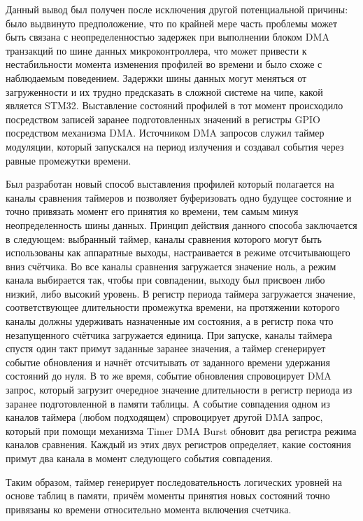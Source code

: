 \documentclass{report}
\begin{document}
Данный вывод был получен после исключения другой потенциальной причины: было выдвинуто предположение, что по крайней мере часть проблемы может быть связана с неопределенностью задержек при выполнении блоком DMA транзакций по шине данных микроконтроллера, что может привести к нестабильности момента изменения профилей во времени и было схоже с наблюдаемым поведением. Задержки шины данных могут меняться от загруженности \cite{stm32dmalatency} и их трудно предсказать в сложной системе на чипе, какой является STM32. Выставление состояний профилей в тот момент происходило посредством записей заранее подготовленных значений в регистры GPIO посредством механизма DMA. Источником DMA запросов служил таймер модуляции, который запускался на период излучения и создавал события через равные промежутки времени.

Был разработан новый способ выставления профилей который полагается на каналы сравнения таймеров и позволяет буферизовать одно будущее состояние и точно привязать момент его принятия ко времени, тем самым минуя неопределенность шины данных. Принцип действия данного способа заключается в следующем: выбранный таймер, каналы сравнения которого могут быть использованы как аппаратные выходы, настраивается в режиме отсчитывающего вниз счётчика. Во все каналы сравнения загружается значение ноль, а режим канала выбирается так, чтобы при совпадении, выходу был присвоен либо низкий, либо высокий уровень. В регистр периода таймера загружается значение, соответствующее длительности промежутка времени, на протяжении которого каналы должны удерживать назначенные им состояния, а в регистр пока что незапущенного счётчика загружается единица. При запуске, каналы таймера спустя один такт примут заданные заранее значения, а таймер сгенерирует событие обновления и начнёт отсчитывать от заданного времени удержания состояний до нуля. В то же время, событие обновления спровоцирует DMA запрос, который загрузит очередное значение длительности в регистр периода из заранее подготовленной в памяти таблицы. А событие совпадения одном из каналов таймера (любом подходящем) спровоцирует другой DMA запрос, который при помощи механизма Timer DMA Burst обновит два регистра режима каналов сравнения. Каждый из этих двух регистров определяет, какие состояния примут два канала в момент следующего события совпадения.

Таким образом, таймер генерирует последовательность логических уровней на основе таблиц в памяти, причём моменты принятия новых состояний точно привязаны ко времени относительно момента включения счетчика.
\end{document}
